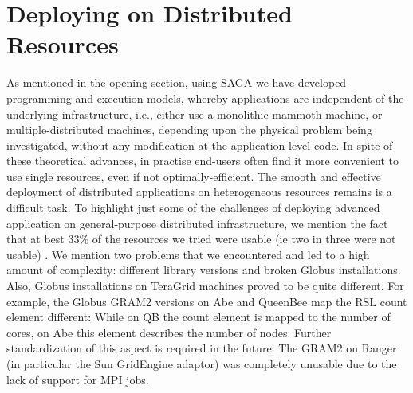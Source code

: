 \documentclass{llncs}
\begin{document}
\up

\section{Deploying on Distributed Resources}

\up

 

As mentioned in the opening section, using SAGA we have developed
programming and execution models, whereby applications are independent
of the underlying infrastructure, i.e., either use a monolithic
mammoth machine, or multiple-distributed machines, depending upon the
physical problem being investigated, without any modification at the
application-level code. In spite of these theoretical advances, in
practise end-users often find it more convenient to use single
resources, even if not optimally-efficient.  The smooth and effective
deployment of distributed applications on heterogeneous resources
remains is a difficult task.  To highlight just some of the challenges
of deploying advanced application on general-purpose distributed
infrastructure, we mention the fact that at best 33\% of the resources
we tried were usable (ie two in three were not usable) .  We mention
two problems that we encountered and led to a high amount of
complexity: different library versions and broken Globus
installations.  Also, Globus installations on TeraGrid machines proved
to be quite different.  For example, the Globus GRAM2 versions on Abe
and QueenBee map the RSL count element different: While on QB the
count element is mapped to the number of cores, on Abe this element
describes the number of nodes. Further standardization of this aspect
is required in the future. The GRAM2 on Ranger (in particular the Sun
GridEngine adaptor) was completely unusable due to the lack of support
for MPI jobs.

\end{document}

